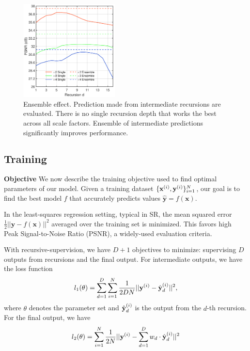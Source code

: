 \documentclass[10pt,twocolumn,letterpaper]{article}
\begin{document}
\begin{figure}
\centering
{\graphicspath{{figs/graph1/}}\includegraphics[width=5cm]{graphEnsemble}}
\caption{Ensemble effect. Prediction made from intermediate recursions are evaluated. There is no single recursion depth that works the best across all scale factors. Ensemble of intermediate predictions significantly improves performance. }
\label{fig:ensemble}
\end{figure}

\subsection{Training}

\textbf{Objective} We now describe the training objective used to find optimal parameters of our model. Given a training dataset $\{{\bf x}^{(i)},{\bf y}^{(i)}\}{}_{i=1}^{N}$, our goal is to find the best model $f$ that accurately predicts values $\mathbf{\hat{y}}=f(\mathbf{x})$.

In the least-squares regression setting, typical in SR, the mean squared error $\frac{1}{2}||\mathbf{y}-f(\mathbf{x})||^{2}$
averaged over the training set is minimized. This favors high Peak Signal-to-Noise
Ratio (PSNR), a widely-used evaluation criteria. 

With recursive-supervision, we have $D+1$ objectives to minimize: supervising $D$ outputs from recursions and the final output. For intermediate outputs, we have the loss function 
\begin{equation}
l_1(\theta) = \sum_{d=1}^D \sum_{i=1}^N \frac{1}{2DN}||{\bf y}^{(i)} -  \hat{\bf y}_d^{(i)} ||^{2},
\end{equation}
where $\theta$ denotes the parameter set and $\hat{\bf y}_d^{(i)}$ is the output from the $d$-th recursion. For the final output, we have 
\begin{equation}
l_2(\theta) = \sum_{i=1}^N \frac{1}{2N}||{\bf y}^{(i)} -  \sum_{d=1}^D  w_d \cdot \hat{\bf y}_d^{(i)} ||^{2}
\end{equation}
\end{document}
